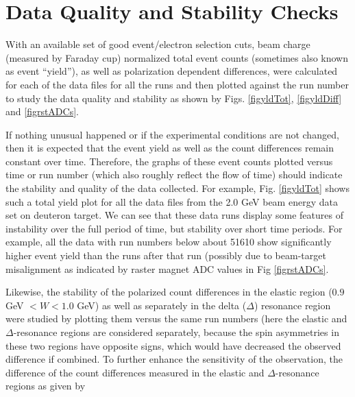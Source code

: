 

\section{Data Quality and Stability Checks}
With an available set of good  event/electron selection cuts, beam charge (measured by Faraday cup) normalized total event counts (sometimes also known as event ``yield''), as well as polarization dependent %
differences, were calculated for each of the data files for all the runs %
and then plotted against the run number to study the data quality and stability as shown by Figs. \ref{figyldTot}, \ref{figyldDiff} and \ref{figrstADCs}.

If nothing unusual happened or if the experimental conditions are not changed, %
then it is expected that the event yield as well as the count differences remain constant over time. Therefore, the graphs of these event counts plotted versus time or run number (which also roughly reflect the flow of time) should indicate the stability and quality of the data collected. For example, Fig. \ref{figyldTot} shows such a total yield plot for all the data files from the 2.0 GeV beam energy data set on deuteron target. We can see that these data runs display %
 some features of instability over the full period of time, but %
 stability over short time periods. For example, all the data with run numbers below about 51610 show significantly higher event yield than the runs after that run %
 (possibly due to  beam-target misalignment %
 as indicated by raster magnet ADC values in Fig \ref{figrstADCs}. 



Likewise, the stability of the polarized %
count differences in the elastic region ($0.9$ GeV $<W<1.0$ GeV) as well as separately in the delta ($\Delta$) resonance region were studied by plotting them versus the same run numbers (here the elastic and $\Delta$-resonance regions are %
considered separately, because the spin asymmetries in these two regions have opposite signs, which would 
have decreased the observed difference if combined.
To further enhance the sensitivity of the observation, the difference of the count differences measured in the elastic and $\Delta$-resonance regions as given by 

